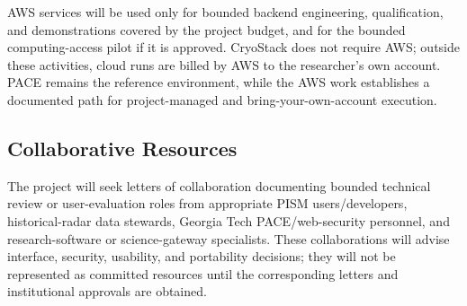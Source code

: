 AWS services will be used only for bounded backend engineering, qualification,
and demonstrations covered by the project budget, and for the bounded
computing-access pilot if it is approved. CryoStack does not require AWS;
outside these activities, cloud runs are billed by AWS to the researcher's own
account. PACE remains the reference environment, while the AWS work
establishes a documented path for project-managed and bring-your-own-account
execution.

\subsection*{Collaborative Resources}

The project will seek letters of collaboration documenting bounded technical
review or user-evaluation roles from appropriate PISM users/developers,
historical-radar data stewards, Georgia Tech PACE/web-security personnel, and
research-software or science-gateway specialists. These collaborations will advise interface, security, usability,
and portability decisions; they will not be represented as committed resources
until the corresponding letters and institutional approvals are obtained.
